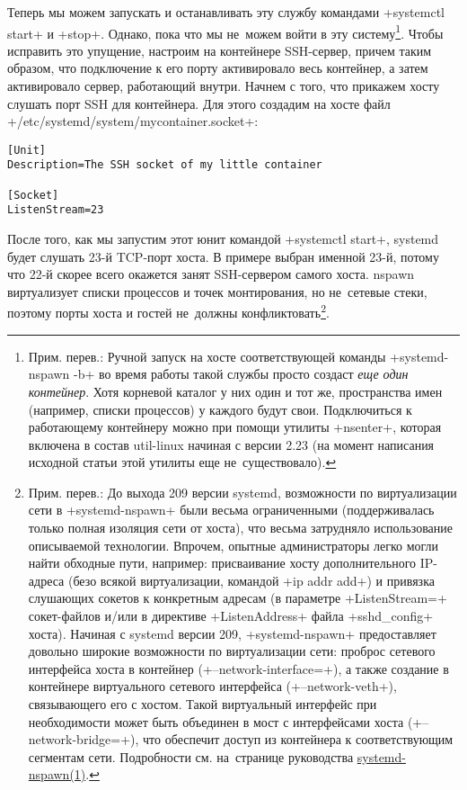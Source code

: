 \documentclass[10pt,oneside,a4paper]{article}
\begin{document}
Теперь мы можем запускать и останавливать эту службу командами +systemctl start+
и +stop+. Однако, пока что мы не~можем войти в эту систему\footnote{Прим.
перев.: Ручной запуск на хосте соответствующей команды +systemd-nspawn -b+ во
время работы такой службы просто создаст \emph{еще один контейнер}. Хотя
корневой каталог у них один и тот же, пространства имен (например, списки
процессов) у каждого будут свои. Подключиться к работающему контейнеру можно при
помощи утилиты +nsenter+, которая включена в состав util-linux начиная с версии
2.23 (на момент написания исходной статьи этой утилиты еще не~существовало).}.
Чтобы исправить это упущение, настроим на контейнере SSH-сервер, причем таким
образом, что подключение к его порту активировало весь контейнер, а затем
активировало сервер, работающий внутри. Начнем с того, что прикажем хосту
слушать порт SSH для контейнера. Для этого создадим на хосте файл
+/etc/systemd/system/mycontainer.socket+:
\begin{Verbatim}
[Unit]
Description=The SSH socket of my little container

[Socket]
ListenStream=23
\end{Verbatim}

После того, как мы запустим этот юнит командой +systemctl start+, systemd будет
слушать 23-й TCP-порт хоста. В примере выбран именной 23-й, потому что 22-й
скорее всего окажется занят SSH-сервером самого хоста. nspawn виртуализует
списки процессов и точек монтирования, но не~сетевые стеки, поэтому порты хоста
и гостей не~должны конфликтовать\footnote{Прим. перев.: До выхода 209 версии
systemd, возможности по виртуализации сети в +systemd-nspawn+ были весьма
ограниченными (поддерживалась только полная изоляция сети от хоста), что весьма
затрудняло использование описываемой технологии. Впрочем, опытные администраторы
легко могли найти обходные пути, например: присваивание хосту дополнительного
IP-адреса (безо всякой виртуализации, командой +ip addr add+) и привязка
слушающих сокетов к конкретным адресам (в параметре +ListenStream=+ сокет-файлов
и/или в директиве +ListenAddress+ файла +sshd_config+ хоста). Начиная с systemd
версии 209, +systemd-nspawn+ предоставляет довольно широкие возможности по
виртуализации сети: проброс сетевого интерфейса хоста в контейнер
(+--network-interface=+), а также создание в контейнере виртуального сетевого
интерфейса (+--network-veth+), связывающего его с хостом. Такой виртуальный
интерфейс при необходимости может быть объединен в мост с интерфейсами хоста
(+--network-bridge=+), что обеспечит доступ из контейнера к соответствующим
сегментам сети. Подробности см. на~странице руководства
\href{http://www.freedesktop.org/software/systemd/man/systemd-nspawn.html}{systemd-nspawn(1)}.}. 
\end{document}
